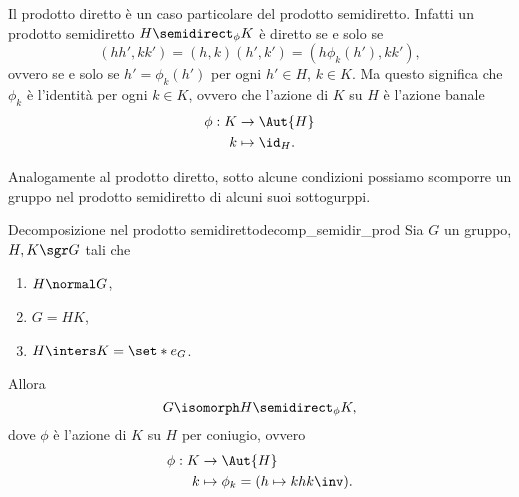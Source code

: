\begin{remark}
    Il prodotto diretto è un caso particolare del prodotto semidiretto. Infatti un prodotto semidiretto $H \semidirect_{\phi} K$ è diretto se e solo se \[
        (hh', kk') = (h, k)(h', k') = (h\phi_k(h'), kk'),
    \] ovvero se e solo se $h' = \phi_k(h')$ per ogni $h' \in H$, $k \in K$. Ma questo significa che $\phi_k$ è l'identità per ogni $k \in K$, ovvero che l'azione di $K$ su $H$ è l'azione banale \begin{align*}
        \phi : K &\to \Aut{H}\\
        k &\mapsto \id_{H}.
    \end{align*}  
\end{remark}

Analogamente al prodotto diretto, sotto alcune condizioni possiamo scomporre un gruppo nel prodotto semidiretto di alcuni suoi sottogurppi.

\begin{theorem}
    {Decomposizione nel prodotto semidiretto}{decomp_semidir_prod}
    Sia $G$ un gruppo, $H, K \sgr G$ tali che \begin{enumerate}[(1)]
        \item $H \normal G$,
        \item $G = HK$,
        \item $H \inters K = \set*{e_G}$.  
    \end{enumerate} 
    Allora \[
        G \isomorph H \semidirect_{\phi} K,
    \] dove $\phi$ è l'azione di $K$ su $H$ per coniugio, ovvero \begin{align*}
        \phi : K &\to \Aut{H}\\
        k &\mapsto \phi_k = (h \mapsto khk\inv).
    \end{align*}
\end{theorem}